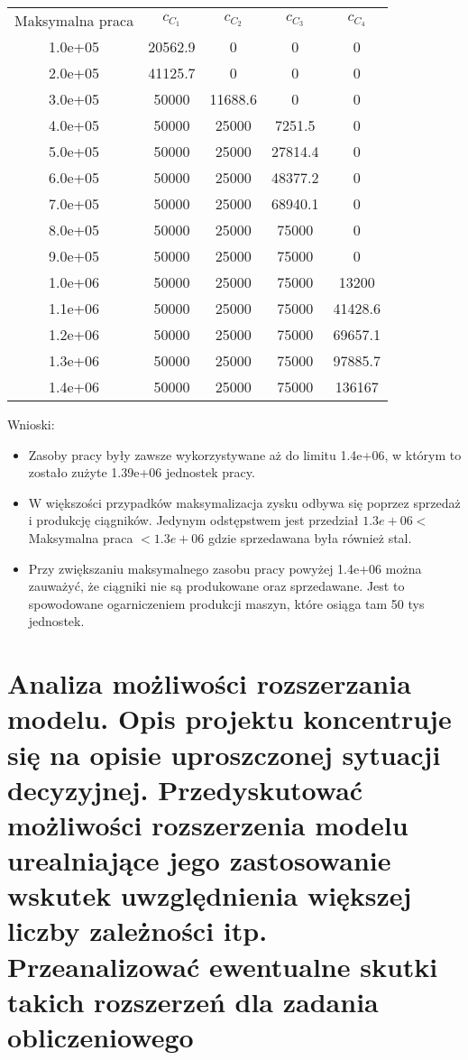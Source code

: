 \documentclass{article}
\begin{document}
\begin{center}
\begin{tabular}{c c c c c }
  Maksymalna praca& $c_C_1$& $c_C_2$& $c_C_3$& $c_C_4$ \\
1.0e+05  &20562.9  &0        &0        &0 \\
2.0e+05  &41125.7  &0        &0        &0 \\
3.0e+05  &50000    &11688.6  &0        &0 \\
4.0e+05  &50000    &25000    &7251.5   &0 \\
5.0e+05  &50000    &25000    &27814.4  &0 \\
6.0e+05  &50000    &25000    &48377.2  &0 \\
7.0e+05  &50000    &25000    &68940.1  &0 \\
8.0e+05  &50000    &25000    &75000    &0 \\
9.0e+05  &50000    &25000    &75000    &0 \\
1.0e+06  &50000    &25000    &75000    &13200 \\
1.1e+06  &50000    &25000    &75000    &41428.6 \\
1.2e+06  &50000    &25000    &75000    &69657.1 \\
1.3e+06  &50000    &25000    &75000    &97885.7 \\
1.4e+06  &50000    &25000    &75000    &136167 
\end{tabular} 
\end{center}

Wnioski:

\begin{itemize}
    \item Zasoby pracy były zawsze wykorzystywane aż do limitu 1.4e+06, w którym to zostało zużyte 1.39e+06 jednostek pracy. 
    \item W większości przypadków maksymalizacja zysku odbywa się poprzez sprzedaż i produkcję ciągników. Jedynym odstępstwem jest przedział $1.3e+06 < $ Maksymalna praca $ < 1.3e+06$ gdzie sprzedawana była również stal. 
    \item Przy zwiększaniu maksymalnego zasobu pracy powyżej 1.4e+06 można zauważyć, że ciągniki nie są produkowane oraz sprzedawane. Jest to spowodowane ogarniczeniem produkcji maszyn, które osiąga tam 50 tys jednostek.
\end{itemize}

\section{Analiza  możliwości  rozszerzania  modelu.  Opis  projektu  koncentruje  się  na  opisie uproszczonej  sytuacji  decyzyjnej.  Przedyskutować  możliwości  rozszerzenia  modelu urealniające  jego  zastosowanie  wskutek  uwzględnienia  większej  liczby  zależności  itp. Przeanalizować ewentualne skutki takich rozszerzeń dla zadania obliczeniowego}
\end{document}
